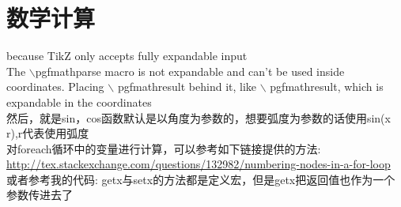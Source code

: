\section{数学计算}
 because TikZ only accepts fully expandable input\\
 The $\backslash $pgfmathparse macro is not expandable and can't be used inside coordinates. Placing $\backslash$ pgfmathresult 
 behind it, like $\backslash$ pgfmathresult, which is expandable in the coordinates\\
 然后，就是sin，cos函数默认是以角度为参数的，想要弧度为参数的话使用sin(x r),r代表使用弧度\\
 对foreach循环中的变量进行计算，可以参考如下链接提供的方法:
 \href{stackexchange}{http://tex.stackexchange.com/questions/132982/numbering-nodes-in-a-for-loop}
 或者参考我的代码:
 getx与setx的方法都是定义宏，但是getx把返回值也作为一个参数传进去了
